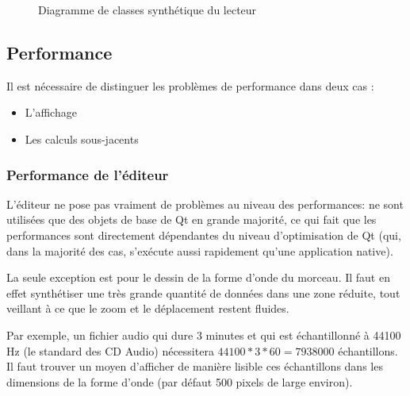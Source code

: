 \begin{figure}[H]
\begin{center}
\caption{Diagramme de classes synthétique du lecteur}
\label{diag_player}
\end{center}
\end{figure}

\subsection{Performance}
Il est nécessaire de distinguer les problèmes de performance dans deux cas :

\begin{itemize}
	\item L'affichage
	\item Les calculs sous-jacents
\end{itemize}

\subsubsection{Performance de l'éditeur}
L'éditeur ne pose pas vraiment de problèmes au niveau des performances: ne sont utilisées que des
objets de base de Qt en grande majorité, ce qui fait que les performances sont directement dépendantes du niveau
d'optimisation de Qt (qui, dans la majorité des cas, s'exécute aussi rapidement qu'une application native).

La seule exception est pour le dessin de la forme d'onde du morceau. Il faut en effet synthétiser une très grande quantité de données dans
une zone réduite, tout veillant à ce que le zoom et le déplacement restent fluides.

Par exemple, un fichier audio qui dure 3 minutes et qui est échantillonné à 44100 Hz (le standard des CD Audio)
nécessitera $44100 * 3 * 60 = 7938000$ échantillons. Il faut trouver un moyen d'afficher de manière lisible ces
échantillons dans les dimensions de la forme d'onde (par défaut 500 pixels de large environ).

